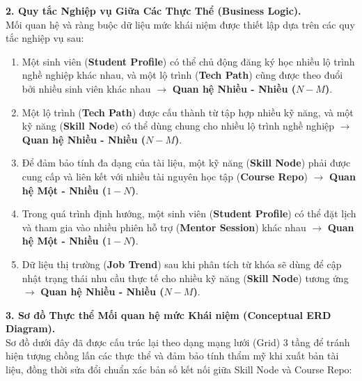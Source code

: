 \documentclass{article}
\begin{document}
	\vspace{0.3cm}
	
	\noindent \textbf{2. Quy tắc Nghiệp vụ Giữa Các Thực Thể (Business Logic).} \\
	\indent Mối quan hệ và ràng buộc dữ liệu mức khái niệm được thiết lập dựa trên các quy tắc nghiệp vụ sau:
	\begin{enumerate}
		\item Một sinh viên (\textbf{Student Profile}) có thể chủ động đăng ký học nhiều lộ trình nghề nghiệp khác nhau, và một lộ trình (\textbf{Tech Path}) cũng được theo đuổi bởi nhiều sinh viên khác nhau $\rightarrow$ \textbf{Quan hệ Nhiều - Nhiều ($N-M$)}.
		\item Một lộ trình (\textbf{Tech Path}) được cấu thành từ tập hợp nhiều kỹ năng, và một kỹ năng (\textbf{Skill Node}) có thể dùng chung cho nhiều lộ trình nghề nghiệp $\rightarrow$ \textbf{Quan hệ Nhiều - Nhiều ($N-M$)}.
		\item Để đảm bảo tính đa dạng của tài liệu, một kỹ năng (\textbf{Skill Node}) phải được cung cấp và liên kết với nhiều tài nguyên học tập (\textbf{Course Repo}) $\rightarrow$ \textbf{Quan hệ Một - Nhiều ($1-N$)}.
		\item Trong quá trình định hướng, một sinh viên (\textbf{Student Profile}) có thể đặt lịch và tham gia vào nhiều phiên hỗ trợ (\textbf{Mentor Session}) khác nhau $\rightarrow$ \textbf{Quan hệ Một - Nhiều ($1-N$)}.
		\item Dữ liệu thị trường (\textbf{Job Trend}) sau khi phân tích từ khóa sẽ dùng để cập nhật trạng thái nhu cầu thực tế cho nhiều kỹ năng (\textbf{Skill Node}) tương ứng $\rightarrow$ \textbf{Quan hệ Nhiều - Nhiều ($N-M$)}.
	\end{enumerate}
	
	\vspace{0.3cm}
	
	\noindent \textbf{3. Sơ đồ Thực thể Mối quan hệ mức Khái niệm (Conceptual ERD Diagram).} \\
	\indent Sơ đồ dưới đây đã được cấu trúc lại theo dạng mạng lưới (Grid) 3 tầng để tránh hiện tượng chồng lấn các thực thể và đảm bảo tính thẩm mỹ khi xuất bản tài liệu, đồng thời sửa đổi chuẩn xác bản số kết nối giữa Skill Node và Course Repo:
	
\end{document}
